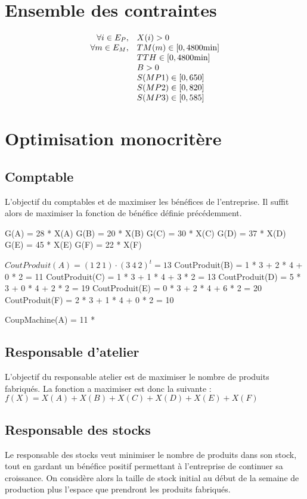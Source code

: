 \documentclass[a4paper, 11pt]{article}
\begin{document}
\section{Ensemble des contraintes}
$$
\begin{array}{r l}
    \forall i\in E_P, & X(i) > 0 \\
    \forall m\in E_M, & TM(m) \in [0, 4800\mbox{min}] \\
                      & TTH \in [0, 4800\mbox{min}] \\
                      & B > 0 \\
                      & S(MP1) \in [0, 650] \\
                      & S(MP2) \in [0, 820] \\
                      & S(MP3) \in [0, 585] \\
\end{array}
$$

\section{Optimisation monocritère}
\subsection{Comptable}
L'objectif du comptables et de maximiser les bénéfices de l'entreprise.
Il suffit alors de maximiser la fonction de bénéfice définie précédemment.

G(A) = 28 * X(A)
G(B) = 20 * X(B)
G(C) = 30 * X(C)
G(D) = 37 * X(D)
G(E) = 45 * X(E)
G(F) = 22 * X(F)

$CoutProduit(A) = (1~2~1)\cdot(3~4~2)^t = 13$
CoutProduit(B) = 1 * 3 + 2 * 4 + 0 * 2 = 11
CoutProduit(C) = 1 * 3 + 1 * 4 + 3 * 2 = 13
CoutProduit(D) = 5 * 3 + 0 * 4 + 2 * 2 = 19
CoutProduit(E) = 0 * 3 + 2 * 4 + 6 * 2 = 20
CoutProduit(F) = 2 * 3 + 1 * 4 + 0 * 2 = 10

CoupMachine(A) = 11 * 

\subsection{Responsable d'atelier}
L'objectif du responsable atelier est de maximiser le nombre de produits fabriqués.
La fonction a maximiser est donc la suivante : \\
$ f(X) = X(A) + X(B) + X(C) + X(D) + X(E) + X(F) $

\subsection{Responsable des stocks}
Le responsable des stocks veut minimiser le nombre de produits dans son stock,
tout en gardant un bénéfice positif permettant à l'entreprise de continuer sa croissance.
On considère alors la taille de stock initial au début de la semaine de production
plus l'espace que prendront les produits fabriqués.
\end{document}
